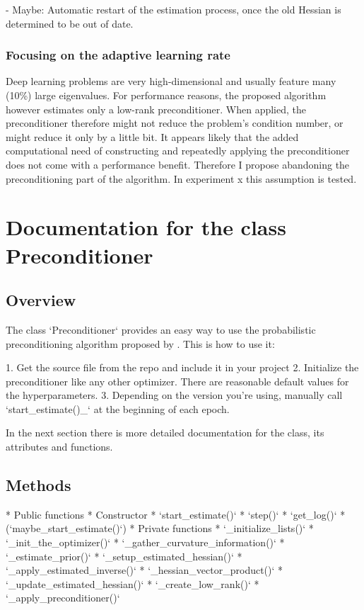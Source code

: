 \documentclass[twoside,12pt,a4paper]{report}
\begin{document}
- Maybe: Automatic restart of the estimation process, once the old Hessian is determined to be out of date.

\subsubsection{Focusing on the adaptive learning rate}
Deep learning problems are very high-dimensional and usually feature many (10\%) large eigenvalues. For performance reasons, the proposed algorithm however estimates only a low-rank preconditioner. When applied, the preconditioner therefore might not reduce the problem's condition number, or might reduce it only by a little bit. It appears likely that the added computational need of constructing and repeatedly applying the preconditioner does not come with a performance benefit. Therefore I propose abandoning the preconditioning part of the algorithm. In experiment x  this assumption is tested.

\section{Documentation for the class Preconditioner}
\subsection{Overview}
\begin{markdown}
The class `Preconditioner` provides an easy way to use the probabilistic preconditioning algorithm proposed by \cite{de2019active}.
This is how to use it:

1. Get the source file from the repo and include it in your project
2. Initialize the preconditioner like any other optimizer. There are reasonable default values for the hyperparameters.
3. Depending on the version you're using, manually call `start_estimate()_` at the beginning of each epoch.

In the next section there is more detailed documentation for the class, its attributes and functions.
\end{markdown}

\subsection{Methods}
\begin{markdown}
* Public functions
	* Constructor
	* `start_estimate()`
	* `step()`
	* `get_log()`
	* (`maybe_start_estimate()`)
* Private functions
	* `_initialize_lists()`
	* `_init_the_optimizer()`
	* `_gather_curvature_information()`
	* `_estimate_prior()`
	* `_setup_estimated_hessian()`
	* `_apply_estimated_inverse()`
	* `_hessian_vector_product()`
	* `_update_estimated_hessian()`
	* `_create_low_rank()`
	* `_apply_preconditioner()`
	
\end{markdown}
\end{document}
